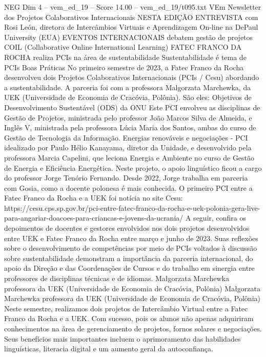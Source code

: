 \begin{textsample}{NEG Dim 4 – vem\_ed\_19 – Score 14.00 – vem\_ed\_19/t095.txt}  \label{ex:f4_neg_062}
VEm Newsletter dos Projetos Colaborativos Internacionais NESTA EDIÇÃO ENTREVISTA com Rosi León, diretora de Intercâmbios Virtuais e Aprendizagem On-line na DePaul University (EUA) EVENTOS INTERNACIONAIS debatem gestão de projetos COIL (Collaborative Online International Learning) FATEC FRANCO DA ROCHA realiza PCIs na área de sustentabilidade Sustentabilidade é tema de PCIs Boas Práticas No primeiro semestre de 2023, a Fatec Franco da Rocha desenvolveu dois Projetos Colaborativos Internacionais (PCIs / Cesu) abordando a sustentabilidade.
A parceria foi com a professora Malgorzata Marchewka, da UEK (Universidade de Economia de Cracóvia, Polônia).
São eles: Objetivos de Desenvolvimento Sustentável (ODS) da ONU Este PCI envolveu as disciplinas de Gestão de Projetos, ministrada pelo professor João Marcos Silva de Almeida, e Inglês V, ministrada pela professora Lúcia Maria dos Santos, ambas do curso de Gestão de Tecnologia da Informação.
Energias renováveis e negociações - PCI idealizado por Paulo Hélio Kanayama, diretor da Unidade, e desenvolvido pela professora Marcia Capelini, que leciona Energia e Ambiente no curso de Gestão de Energia e Eficiência Energética.
Neste projeto, o apoio linguístico ficou a cargo do professor Jorge Tenório Fernando.
Desde 2022, Jorge trabalha em parceria com Gosia, como a docente polonesa é mais conhecida.
O primeiro PCI entre a Fatec Franco da Rocha e a UEK foi notícia no site Cesu: https://cesu.cps.sp.gov.br/pci-entre-fatec-franco-da-rocha-e-uek-polonia-gera-live-para-angariar-doacoes-para-criancas-e-jovens-da-ucrania/ A seguir, confira os depoimentos de docentes e gestores envolvidos nos dois projetos desenvolvidos entre UEK e Fatec Franco da Rocha entre março e junho de 2023.
Suas reflexões sobre o desenvolvimento de competências por meio de PCIs voltados à discussão sobre sustentabilidade demonstram a importância da parceria internacional, do apoio da Direção e das Coordenações de Cursos e do trabalho em sinergia entre professores de disciplinas técnicas e de idiomas.
Małgorzata Marchewka professora da UEK (Universidade de Economia de Cracóvia, Polônia) Małgorzata Marchewka professora da UEK (Universidade de Economia de Cracóvia, Polônia) Neste semestre, realizamos dois projetos de Intercâmbio Virtual entre a Fatec Franco da Rocha e a UEK.
Com sucesso, pois os alunos não apenas adquiriram conhecimentos na área de gerenciamento de projetos, fornos solares e negociações.
Seus benefícios mais importantes incluem o aprimoramento das habilidades linguísticas, literacia digital e um aumento geral da autoconfiança.

\end{textsample}
